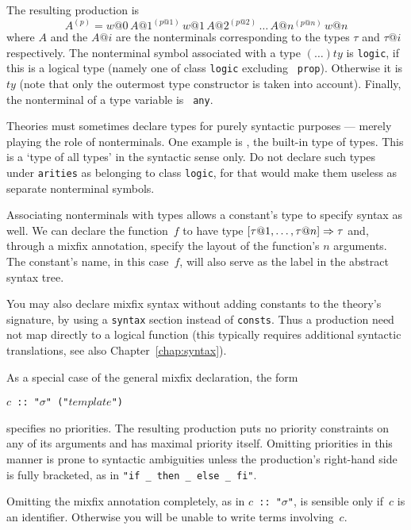 %
The resulting production is \[ A^{(p)}= w@0\, A@1^{(p@1)}\, w@1\,
A@2^{(p@2)}\, \dots\, A@n^{(p@n)}\, w@n \] where $A$ and the $A@i$ are the
nonterminals corresponding to the types $\tau$ and $\tau@i$ respectively.
The nonterminal symbol associated with a type $(\ldots)ty$ is {\tt logic}, if
this is a logical type (namely one of class {\tt logic} excluding {\tt
prop}).  Otherwise it is $ty$ (note that only the outermost type constructor
is taken into account).  Finally, the nonterminal of a type variable is {\tt
any}.

\begin{warn}
  Theories must sometimes declare types for purely syntactic purposes ---
  merely playing the role of nonterminals.  One example is , the
  built-in type of types.  This is a `type of all types' in the syntactic
  sense only.  Do not declare such types under {\tt arities} as belonging to
  class {\tt logic}, for that would make them useless as
  separate nonterminal symbols.
\end{warn}

Associating nonterminals with types allows a constant's type to specify
syntax as well.  We can declare the function~$f$ to have type $[\tau@1,
\ldots, \tau@n]\To \tau$ and, through a mixfix annotation, specify the layout
of the function's $n$ arguments.  The constant's name, in this case~$f$, will
also serve as the label in the abstract syntax tree.

You may also declare mixfix syntax without adding constants to the theory's
signature, by using a {\tt syntax} section instead of {\tt consts}.  Thus a
production need not map directly to a logical function (this typically
requires additional syntactic translations, see also
Chapter~\ref{chap:syntax}).


\medskip
As a special case of the general mixfix declaration, the form
\begin{center}
  {\tt $c$ ::\ "$\sigma$" ("$template$")}
\end{center}
specifies no priorities.  The resulting production puts no priority
constraints on any of its arguments and has maximal priority itself.
Omitting priorities in this manner is prone to syntactic ambiguities unless
the production's right-hand side is fully bracketed, as in
\verb|"if _ then _ else _ fi"|.

Omitting the mixfix annotation completely, as in {\tt $c$ ::\ "$\sigma$"},
is sensible only if~$c$ is an identifier.  Otherwise you will be unable to
write terms involving~$c$.



